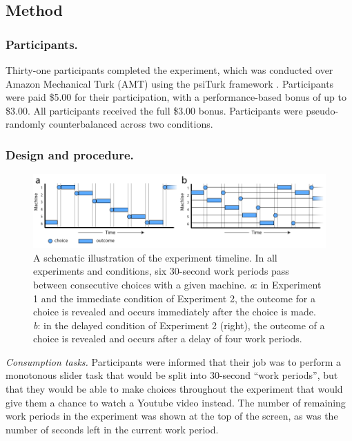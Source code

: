 \documentclass[10pt,letterpaper]{article}
\begin{document}
\subsection{Method}

\subsubsection{Participants.}

Thirty-one participants completed the experiment, which was conducted over
Amazon Mechanical Turk (AMT) using the psiTurk framework \citep{Gureckis2015a}.
Participants were paid \$5.00 for their participation, with a performance-based
bonus of up to \$3.00. All participants received the full \$3.00 bonus.
Participants were pseudo-randomly counterbalanced across two conditions.

\subsubsection{Design and procedure.}


\begin{figure}
\centering
\includegraphics[width=\textwidth]{figures/machinetimeline.png}
\caption{A schematic illustration of the experiment timeline. In all experiments
  and conditions, six 30-second work periods pass between consecutive choices
  with a given machine. \emph{a}: in Experiment 1 and the immediate condition of
  Experiment 2, the outcome for a choice is revealed and occurs immediately
  after the choice is made. \emph{b}: in the delayed condition of Experiment 2 (right),
  the outcome of a choice is revealed and occurs after a delay of four work
  periods.}
\label{fig:machinetimeline}
\end{figure}



\emph{Consumption tasks.}
Participants were informed that their job was to perform a monotonous slider task that
would be split into 30-second ``work periods'', but that they would be able to
make choices throughout the experiment that would give them a chance to watch a
Youtube video instead. The number of remaining work periods in the experiment was shown
at the top of the screen, as was the number of seconds left in the current work period.
\end{document}
